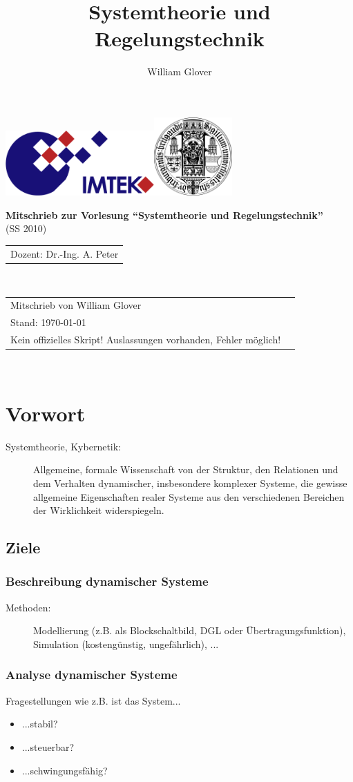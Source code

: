 \message{ !name(Mitschrieb_SysRegel.tex)}\documentclass[12pt,a4paper,ngerman]{scrartcl}
\author{William Glover}
\title{Systemtheorie und Regelungstechnik}
\renewcommand\maketitle{
    \begin{titlepage}
        \sffamily
        \thispagestyle{empty}
              \includegraphics[height=2.5cm]{IMTEK_Logo_Farbe}\hfill\includegraphics[height=3cm]{Uni_Siegel}
        \par
        \vspace{2cm}
        \begin{center}
            \Huge \textbf{Mitschrieb zur Vorlesung ``Systemtheorie und Regelungstechnik''}\\
            (SS 2010)\\[6cm]
            \end{center}
           

            \begin{tabular}{l}
                \large Dozent: Dr.-Ing. A. Peter\\
         \end{tabular}
         \\
						\begin{tabular}{ll}
                \large Mitschrieb von William Glover \\
                \large Stand: \today\\
                \large Kein offizielles Skript! Auslassungen vorhanden, Fehler möglich!
            \end{tabular}
        
        

 			 \newpage 
       \thispagestyle{empty}~
       \newpage

 
\end{titlepage}
}
\renewcommand{\baselinestretch}{1.5} %
\begin{document}

\maketitle %
\clearpage %
\renewcommand{\baselinestretch}{1.5} %
\thispagestyle{empty} %

\tableofcontents %
\newpage 

\setcounter{page}{2} %


\addtocounter{section}{-1}%
\section{Vorwort}

\begin{description}
\item[Systemtheorie, Kybernetik:] Allgemeine, formale Wissenschaft von der Struktur, den Relationen und dem Verhalten dynamischer, insbesondere komplexer Systeme, die gewisse allgemeine Eigenschaften realer Systeme aus den verschiedenen Bereichen der Wirklichkeit widerspiegeln. 
\end{description}

\subsection*{Ziele}

\subsubsection*{Beschreibung dynamischer Systeme}
\begin{description}
\item[Methoden:] Modellierung (z.B. als Blockschaltbild, DGL oder Übertragungsfunktion), Simulation (kostengünstig, ungefährlich), ...
\end{description}

\subsubsection*{Analyse dynamischer Systeme}
Fragestellungen wie z.B. ist das System...
\begin{itemize}
\item ...stabil?
\item ...steuerbar?
\item ...schwingungsfähig?
\end{itemize}
\end{document}
